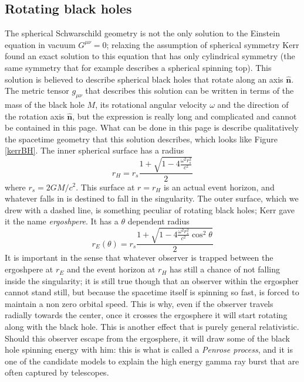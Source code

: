 \subsection{Rotating black holes}
The spherical Schwarschild geometry is not the only solution to the Einstein equation in vacuum $G^{\mu\nu}=0$; relaxing the assumption of spherical symmetry Kerr found an exact solution to this equation that has only cylindrical symmetry (the same symmetry that for example describes a spherical spinning top). This solution is believed to describe spherical black holes that rotate along an axis $\hat{\mathbf{n}}$. The metric tensor $g_{\mu\nu}$ that describes this solution can be written in terms of the mass of the black hole $M$, its rotational angular velocity $\omega$ and the direction of the rotation axis $\hat{\mathbf{n}}$, but the expression is really long and complicated and cannot be contained in this page. What can be done in this page is describe qualitatively the spacetime geometry that this solution describes, which looks like Figure \ref{kerrBH}. The inner spherical surface has a radius 
\begin{equation}
r_H = r_s\frac{1+\sqrt{1-4\frac{\omega^2r_s^2}{c^2}}}{2}  
\end{equation}
where $r_s=2GM/c^2$. This surface at $r=r_H$ is an actual event horizon, and whatever falls in is destined to fall in the singularity. The outer surface, which we drew with a dashed line, is something peculiar of rotating black holes; Kerr gave it the name \textit{ergoshpere}. It has a $\theta$ dependent radius
\begin{equation}
r_{E}(\theta) =  r_s\frac{1+\sqrt{1-4\frac{\omega^2r_s^2}{c^2}\cos^2\theta}}{2}
\end{equation}
It is important in the sense that whatever observer is trapped between the ergoshpere at $r_E$ and the event horizon at $r_H$ has still a chance of not falling inside the singularity; it is still true though that an observer within the ergospher cannot stand still, but because the spacetime itself is spinning so fast, is forced to maintain a non zero orbital speed. This is why, even if the observer travels radially towards the center, once it crosses the ergosphere it will start rotating along with the black hole. This is another effect that is purely general relativistic. Should this observer escape from the ergosphere, it will draw some of the black hole spinning energy with him: this is what is called a \textit{Penrose process}, and it is one of the candidate models to explain the high energy gamma ray burst that are often captured by telescopes.   
